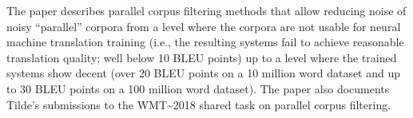 The paper describes parallel corpus filtering methods that allow reducing noise of noisy ``parallel'' corpora from a level where the corpora are not usable for neural machine translation training (i.e., the resulting systems fail to achieve reasonable translation quality; well below 10 BLEU points) up to a level where the trained systems show decent (over 20 BLEU points on a 10 million word dataset and up to 30 BLEU points on a 100 million word dataset). The paper also documents Tilde's submissions to the WMT{\textasciitilde}2018 shared task on parallel corpus filtering.
